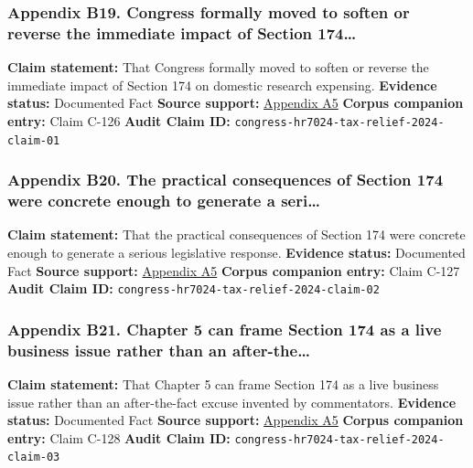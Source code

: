 \documentclass[
  american,
  11pt,
  letterpaper,
]{article}
\begin{document}
\subsubsection{Appendix B19. Congress formally moved to soften or
reverse the immediate impact of Section
174\ldots{}}\label{ch-05-appendix-b19-congress-formally-moved-to-soften-or-reverse-the-immediate-impact-of-section-174}

\textbf{Claim statement:} That Congress formally moved to soften or
reverse the immediate impact of Section 174 on domestic research
expensing. \textbf{Evidence status:} Documented Fact \textbf{Source
support:}
\hyperref[ch-05-appendix-a5-h-r-7024-tax-relief-for-american-families-and-workers-act-of-2024]{Appendix
A5} \textbf{Corpus companion entry:} Claim C-126 \textbf{Audit Claim
ID:} \texttt{congress-hr7024-tax-relief-2024-claim-01}

\subsubsection{Appendix B20. The practical consequences of Section 174
were concrete enough to generate a
seri\ldots{}}\label{ch-05-appendix-b20-the-practical-consequences-of-section-174-were-concrete-enough-to-generate-a-seri}

\textbf{Claim statement:} That the practical consequences of Section 174
were concrete enough to generate a serious legislative response.
\textbf{Evidence status:} Documented Fact \textbf{Source support:}
\hyperref[ch-05-appendix-a5-h-r-7024-tax-relief-for-american-families-and-workers-act-of-2024]{Appendix
A5} \textbf{Corpus companion entry:} Claim C-127 \textbf{Audit Claim
ID:} \texttt{congress-hr7024-tax-relief-2024-claim-02}

\subsubsection{Appendix B21. Chapter 5 can frame Section 174 as a live
business issue rather than an
after-the\ldots{}}\label{ch-05-appendix-b21-chapter-5-can-frame-section-174-as-a-live-business-issue-rather-than-an-after-the}

\textbf{Claim statement:} That Chapter 5 can frame Section 174 as a live
business issue rather than an after-the-fact excuse invented by
commentators. \textbf{Evidence status:} Documented Fact \textbf{Source
support:}
\hyperref[ch-05-appendix-a5-h-r-7024-tax-relief-for-american-families-and-workers-act-of-2024]{Appendix
A5} \textbf{Corpus companion entry:} Claim C-128 \textbf{Audit Claim
ID:} \texttt{congress-hr7024-tax-relief-2024-claim-03}
\end{document}
